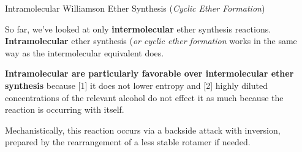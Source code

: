 \documentclass[10pt]{article}
\begin{document}
  \begin{core}{Intramolecular Williamson Ether Synthesis (\textit{Cyclic Ether Formation})}

    So far, we've looked at only \textbf{intermolecular} ether synthesis reactions. \textbf{Intramolecular} ether synthesis (\textit{or cyclic ether formation} works in the same way as the intermolecular equivalent does.


    \textbf{Intramolecular are particularly favorable over intermolecular ether synthesis} because [1] it does not lower entropy and [2] highly diluted concentrations of the relevant alcohol do not effect it as much because the reaction is occurring with itself.

    Mechanistically, this reaction occurs via a backside attack with inversion, prepared by the rearrangement of a less stable rotamer if needed.


\end{core}
\end{document}
